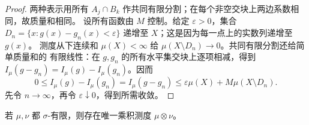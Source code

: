 \begin{proof}
两种表示用所有 $A_j\cap B_k$ 作共同有限分割；在每个非空交块上两边系数相同，故质量和相同。
设所有函数由 $M$ 控制。给定 $\varepsilon>0$，集合
$D_n=\{x:g(x)-g_n(x)<\varepsilon\}$ 递增至 $X$；这是因为每一点上的实数列递增至 $g(x)$。
测度从下连续和 $\mu(X)<\infty$ 给 $\mu(X\setminus D_n)\to0$。共同有限分割还给简单质量和的
有限线性：在 $g,g_n$ 的所有水平集交块上逐项相减，得到
$I_\mu(g-g_n)=I_\mu(g)-I_\mu(g_n)$。因而
\[
 0\le I_\mu(g)-I_\mu(g_n)=I_\mu(g-g_n)
 \le\varepsilon\mu(X)+M\mu(X\setminus D_n).
\]
先令 $n\to\infty$，再令 $\varepsilon\downarrow0$，得到所需收敛。
\end{proof}

\begin{theorem}[乘积测度存在唯一性]\label{theorem:2-3-2-2}
若 $\mu,\nu$ 都 $\sigma$-有限，则存在唯一乘积测度 $\mu\otimes\nu$。
\end{theorem}

